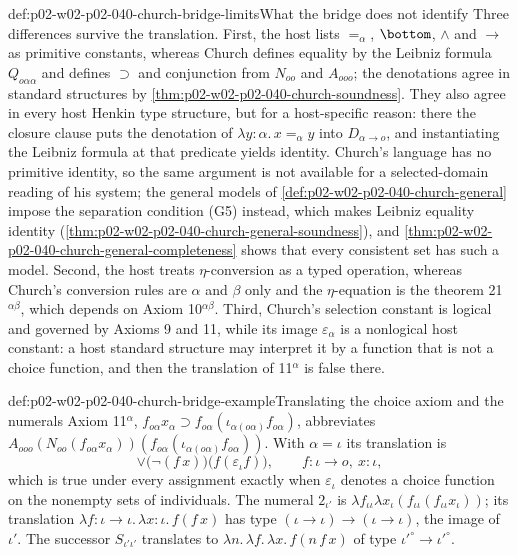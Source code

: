 \begin{hbwarning}{def:p02-w02-p02-040-church-bridge-limits}{What the bridge does not identify}
Three differences survive the translation.  First, the host lists
\(=_\alpha\), \(\bottom\), \(\land\) and \(\to\) as primitive constants,
whereas Church defines equality by the Leibniz formula \(Q_{o\alpha\alpha}\)
and defines \(\supset\) and conjunction from \(N_{oo}\) and \(A_{ooo}\); the
denotations agree in standard structures by
\cref{thm:p02-w02-p02-040-church-soundness}.  They also agree in every host
Henkin type structure, but for a host-specific reason: there the closure
clause puts the denotation of \(\lambda y{:}\alpha.\,x=_\alpha y\) into
\(D_{\alpha\to o}\), and instantiating the Leibniz formula at that predicate
yields identity.  Church's language has no primitive identity, so the
same argument is not available for a selected-domain reading of his
system; the general models of \cref{def:p02-w02-p02-040-church-general}
impose the separation condition (G5) instead, which makes Leibniz equality
identity (\cref{thm:p02-w02-p02-040-church-general-soundness}), and
\cref{thm:p02-w02-p02-040-church-general-completeness} shows that every
consistent set has such a model.  Second, the host treats \(\eta\)-conversion as a
typed operation, whereas Church's conversion rules are \(\alpha\) and
\(\beta\) only and the \(\eta\)-equation is the theorem
21\(^{\alpha\beta}\), which depends on Axiom 10\(^{\alpha\beta}\).  Third,
Church's selection constant is logical and governed by Axioms 9 and 11,
while its image \(\varepsilon_\alpha\) is a nonlogical host constant: a host
standard structure may interpret it by a function that is not a choice
function, and then the translation of 11\(^\alpha\) is false there.
\end{hbwarning}

\begin{hbexample}{def:p02-w02-p02-040-church-bridge-example}{Translating the choice axiom and the numerals}
Axiom 11\(^\alpha\), \(f_{o\alpha}x_\alpha\supset f_{o\alpha}(\iota_{\alpha(o\alpha)}f_{o\alpha})\),
abbreviates \(A_{ooo}(N_{oo}(f_{o\alpha}x_\alpha))(f_{o\alpha}(\iota_{\alpha(o\alpha)}f_{o\alpha}))\).
With \(\alpha=\iota\) its translation is
\[
 \lor\bigl(\neg(f\,x)\bigr)\bigl(f(\varepsilon_\iota f)\bigr),
 \qquad f:\iota\to o,\ x:\iota,
\]
which is true under every assignment exactly when \(\varepsilon_\iota\)
denotes a choice function on the nonempty sets of individuals.  The numeral
\(2_{\iota'}\) is \(\lambda f_{\iota\iota}\lambda x_\iota(f_{\iota\iota}(f_{\iota\iota}x_\iota))\);
its translation
\(\lambda f{:}\iota\to\iota.\,\lambda x{:}\iota.\,f(f\,x)\) has type
\((\iota\to\iota)\to(\iota\to\iota)\), the image of \(\iota'\).  The
successor \(S_{\iota'\iota'}\) translates to
\(\lambda n.\,\lambda f.\,\lambda x.\,f(n\,f\,x)\) of type
\(\iota'^\circ\to\iota'^\circ\).
\end{hbexample}

